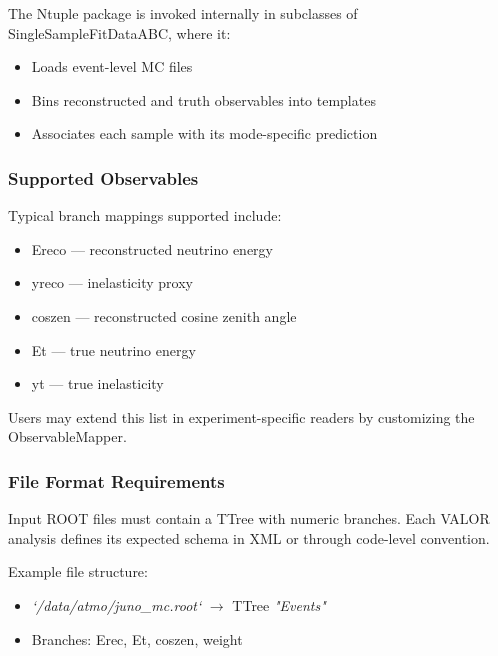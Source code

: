 The {\color{cadmiumgreen} Ntuple} package is invoked internally in subclasses of {\color{cadmiumgreen} SingleSampleFitDataABC}, where it:

\begin{itemize}
  \item Loads event-level MC files
  \item Bins reconstructed and truth observables into templates
  \item Associates each sample with its mode-specific prediction
\end{itemize}

\vspace{1em}
\subsubsection*{Supported Observables}

Typical branch mappings supported include:

\begin{itemize}
  \item {\color{amber}Ereco} — reconstructed neutrino energy
  \item {\color{amber}yreco} — inelasticity proxy
  \item {\color{amber}coszen} — reconstructed cosine zenith angle
  \item {\color{amber}Et} — true neutrino energy
  \item {\color{amber}yt} — true inelasticity
\end{itemize}

Users may extend this list in experiment-specific readers by customizing the {\color{cadmiumgreen} ObservableMapper}.

\vspace{1em}
\subsubsection*{File Format Requirements}

Input ROOT files must contain a {\color{cadmiumgreen} TTree} with numeric branches.  
Each VALOR analysis defines its expected schema in XML or through code-level convention.

\noindent Example file structure:

\begin{itemize}
  \item {\it`/data/atmo/juno\_mc.root`} $\rightarrow$ {\color{cadmiumgreen} TTree} {\it"Events"}
  \item Branches: {\color{amber}Erec}, {\color{amber}Et}, {\color{amber}coszen}, {\color{amber}weight}
\end{itemize}

